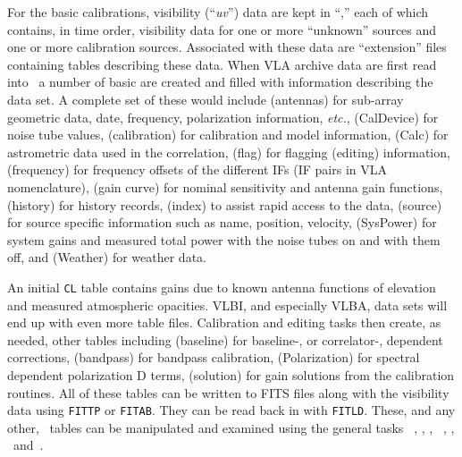      For the basic calibrations, visibility (``{\it uv\/}'') data are
kept in ``,'' each of which contains, in
time order, visibility data for one or more ``unknown'' sources and
one or more calibration sources.  Associated with these data are
``extension'' files containing tables describing these data.
  When VLA archive data are first read into
\AIPS\ a number of basic  are created and filled with
information describing the data set.  A complete set of these would
include 
\xben
{} (antennas) for sub-array geometric data, date,
     frequency, polarization information, {\it etc.\/},
 (CalDevice) for noise tube values,
 (calibration) for calibration and model information,
 (Calc) for astrometric data used in the correlation,
 (flag) for flagging (editing) information,
 (frequency) for frequency offsets of the different
     IFs (IF pairs in VLA nomenclature),
 (gain curve) for nominal sensitivity and antenna gain
     functions,
 (history) for history records,
 (index) to assist rapid access to the data,
 (source) for source specific information such as
     name, position, velocity,
 (SysPower) for system gains and measured total power
     with the noise tubes on and with them off, and
 (Weather) for weather data.
\xeen
\par\noindent An initial {\tt CL} table contains gains due to known
antenna functions of elevation and measured atmospheric opacities.
VLBI, and especially VLBA, data sets will end up with even more table
files.  Calibration and editing tasks then create, as needed, other
tables including
\xben
\setcounter{enumi}{12}
 (baseline) for baseline-, or correlator-,
     dependent corrections,
 (bandpass) for bandpass calibration,
 (Polarization) for spectral dependent polarization D
     terms,
 (solution) for gain solutions from the calibration
     routines.
\xeen
\noindent All of these tables can be written to FITS files along with
the visibility data using {\tt FITTP} or {\tt FITAB}\@.  They can be
read back in with {\tt FITLD}\@.  These, and any other, \AIPS\ tables
can be manipulated and examined using the general tasks {\tt
{}}, {\tt {}}, {\tt {}}, {\tt
{}}, {\tt {}}, \hbox{{\tt {}} and
{\tt {}}}.

